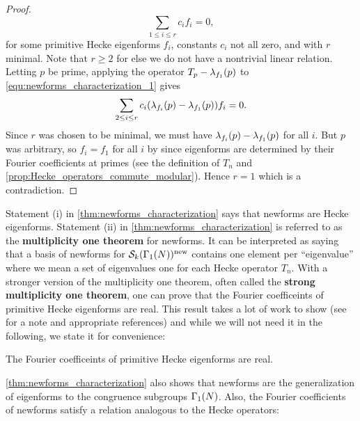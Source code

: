 \begin{proof}
        \begin{equation}\label{equ:newforms_characterization_1}
          \sum_{1 \le i \le r}c_{i}f_{i} = 0,
        \end{equation}
        for some primitive Hecke eigenforms $f_{i}$, constants $c_{i}$ not all zero, and with $r$ minimal. Note that $r \ge 2$ for else we do not have a nontrivial linear relation. Letting $p$ be prime, applying the operator $T_{p}-\lambda_{f_{1}}(p)$ to \cref{equ:newforms_characterization_1} gives
        \[
          \sum_{2 \le i \le r}c_{i}(\lambda_{f_{i}}(p)-\lambda_{f_{1}}(p))f_{i} = 0.
        \]
        Since $r$ was chosen to be minimal, we must have $\lambda_{f_{i}}(p)-\lambda_{f_{1}}(p)$ for all $i$. But $p$ was arbitrary, so $f_{i} = f_{1}$ for all $i$ by since eigenforms are determined by their Fourier coefficients at primes (see the definition of $T_{n}$ and \cref{prop:Hecke_operators_commute_modular}). Hence $r = 1$ which is a contradiction.
      \end{proof}

      Statement (i) in \cref{thm:newforms_characterization} says that newforms are Hecke eigenforms. Statement (ii) in \cref{thm:newforms_characterization} is referred to as the \textbf{multiplicity one theorem} for newforms. It can be interpreted as saying that a basis of newforms for $\mathcal{S}_{k}(\Gamma_{1}(N))^{\mathrm{new}}$ contains one element per ``eigenvalue'' where we mean a set of eigenvalues one for each Hecke operator $T_{n}$. With a stronger version of the multiplicity one theorem, often called the \textbf{strong multiplicity one theorem}, one can prove that the Fourier coefficeints of primitive Hecke eigenforms are real. This result takes a lot of work to show (see \cite{diamond2005first} for a note and appropriate references) and while we will not need it in the following, we state it for convenience:

      \begin{theorem}
        The Fourier coefficeints of primitive Hecke eigenforms are real.
      \end{theorem}
      
        \cref{thm:newforms_characterization} also shows that newforms are the generalization of eigenforms to the congruence subgroups $\Gamma_{1}(N)$. Also, the Fourier coefficients of newforms satisfy a relation analogous to the Hecke operators:

